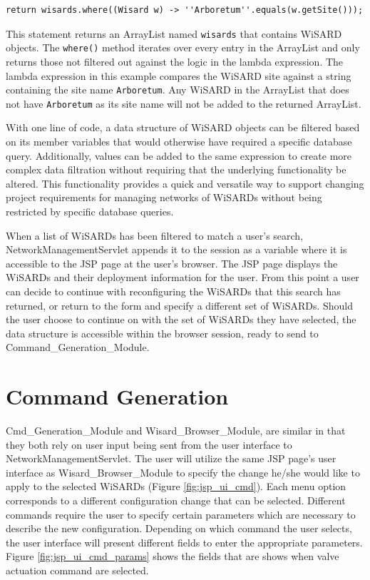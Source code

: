\begin{lstlisting}
return wisards.where((Wisard w) -> ''Arboretum''.equals(w.getSite()));
\end{lstlisting}

This statement returns an ArrayList named \verb|wisards| that contains WiSARD objects. The \verb|where()| method iterates over every entry in the ArrayList and only returns those not filtered out against the logic in the lambda expression. The lambda expression in this example compares the WiSARD site against a string containing the site name \verb|Arboretum|. Any WiSARD in the ArrayList that does not have \verb|Arboretum| as its site name will not be added to the returned ArrayList.

With one line of code, a data structure of WiSARD objects can  be filtered based on its member variables that would otherwise have required a specific database query. Additionally, values can be added to the same expression to create more complex data filtration without requiring that the underlying functionality be altered. This functionality provides a quick and versatile way to support changing project requirements for managing networks of WiSARDs without being restricted by specific database queries.

When a list of WiSARDs has been filtered to match a user's search, NetworkManagementServlet appends it to the session as a variable where it is accessible to the JSP page at the user's browser. The JSP page displays the WiSARDs and their deployment information for the user. From this point a user can decide to continue with reconfiguring the WiSARDs that this search has returned, or return to the form and specify a different set of WiSARDs. Should the user choose to continue on with the set of WiSARDs they have selected, the data structure is accessible within the browser session, ready to send to Command\_Generation\_Module.

\section{Command Generation}
Cmd\_Generation\_Module and Wisard\_Browser\_Module, are similar in that they both rely on user input being sent from the user interface to NetworkManagementServlet. The user will utilize the same JSP page's user interface as Wisard\_Browser\_Module to specify the change he/she would like to apply to the selected WiSARDs (Figure \ref{fig:jsp_ui_cmd}). Each menu option corresponds to a different configuration change that can be selected. Different commands require the user to specify certain parameters which are necessary to describe the new configuration. Depending on which command the user selects, the user interface will present different fields to enter the appropriate parameters. Figure \ref{fig:jsp_ui_cmd_params} shows the fields that are shows when valve actuation command are selected.\\

